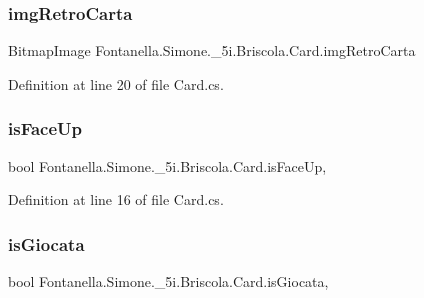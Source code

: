\subsubsection{\texorpdfstring{img\+Retro\+Carta}{imgRetroCarta}}
{\footnotesize\ttfamily Bitmap\+Image Fontanella.\+Simone.\+\_\+5i.\+Briscola.\+Card.\+img\+Retro\+Carta\hspace{0.3cm}{\ttfamily [get]}}



Definition at line 20 of file Card.\+cs.

\hypertarget{class_fontanella_1_1_simone_1_1__5i_1_1_briscola_1_1_card_a802c2936b18253d3341d82b9dd531f5a}{}\label{class_fontanella_1_1_simone_1_1__5i_1_1_briscola_1_1_card_a802c2936b18253d3341d82b9dd531f5a} 
\subsubsection{\texorpdfstring{is\+Face\+Up}{isFaceUp}}
{\footnotesize\ttfamily bool Fontanella.\+Simone.\+\_\+5i.\+Briscola.\+Card.\+is\+Face\+Up\hspace{0.3cm}{\ttfamily [get]}, {\ttfamily [set]}}



Definition at line 16 of file Card.\+cs.

\hypertarget{class_fontanella_1_1_simone_1_1__5i_1_1_briscola_1_1_card_a367b0d4bca4b6b60caf8de05b452e1e9}{}\label{class_fontanella_1_1_simone_1_1__5i_1_1_briscola_1_1_card_a367b0d4bca4b6b60caf8de05b452e1e9} 
\subsubsection{\texorpdfstring{is\+Giocata}{isGiocata}}
{\footnotesize\ttfamily bool Fontanella.\+Simone.\+\_\+5i.\+Briscola.\+Card.\+is\+Giocata\hspace{0.3cm}{\ttfamily [get]}, {\ttfamily [set]}}



